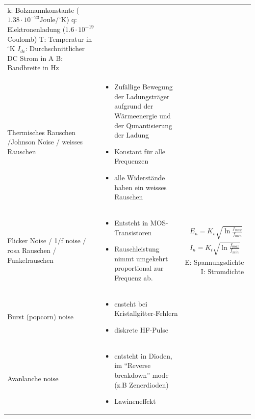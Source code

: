 \begin{longtable}{|p{3.5cm}|p{6cm}|p{8cm}|}
{		k: Bolzmannkonstante ($1.38 \cdot 10^{-23}$Joule/$^\circ$K)\newline
		q: Elektronenladung ($1.6 \cdot 10^{-19}$Coulomb)\newline
		T: Temperatur in $^\circ$K\newline
		$I_{dc}$: Durchschnittlicher DC Strom in A\newline
		B: Bandbreite in Hz
      }
	\\ \hdashline
	Thermisches Rauschen /Johnson Noise / weisses Rauschen
  & \vspace{-1.5\topsep} 
    \begin{itemize}[leftmargin=*]
      \item Zufällige Bewegung der Ladungsträger aufgrund der Wärmeenergie und der Qunantisierung der Ladung
      \item Konstant für alle Frequenzen
      \item alle Widerstände haben ein weisses Rauschen
    \end{itemize}
	&
	\\ \hdashline
  	Flicker Noise / 1/f noise / rosa Rauschen / Funkelrauschen
	& \vspace{-1.5\topsep}
      \begin{itemize}[leftmargin=*]
	  	\item Entsteht in MOS-Transistoren
  	  	\item Rauschleistung nimmt umgekehrt proportional zur Frequenz ab.
  	  \end{itemize}
  	& {\begin{gather*}
          E_{n}=K_{v}\sqrt{\ln{\frac{f_{max}}{f_{min}}}}\\
          I_{n}=K_{i}\sqrt{\ln{\frac{f_{max}}{f_{min}}}}
        \end{gather*}}
        E: Spannungsdichte $\qquad$ 
        I: Stromdichte
  \\ \hdashline
    Burst (popcorn) noise &
    \vspace{-1.5\topsep}
    \begin{itemize}
      \item ensteht bei Kristallgitter-Fehlern
      \item diskrete HF-Pulse
    \end{itemize} &
  \\ \hdashline
    Avanlanche noise &
    \vspace{-1.5\topsep}
    \begin{itemize}
      \item entsteht in Dioden, im "`Reverse breakdown"' mode (z.B Zenerdioden)
      \item Lawineneffekt
    \end{itemize} &
	\\ \hline    
\end{longtable}
